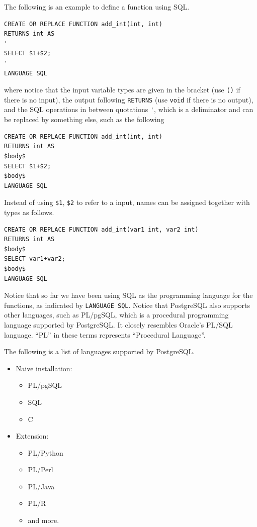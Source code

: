 The following is an example to define a function using SQL.
\begin{lstlisting}
CREATE OR REPLACE FUNCTION add_int(int, int)
RETURNS int AS
'
SELECT $1+$2;
'
LANGUAGE SQL
\end{lstlisting}
where notice that the input variable types are given in the bracket (use \verb|()| if there is no input), the output following \verb|RETURNS| (use \verb|void| if there is no output), and the SQL operations in between quotations \verb|'|, which is a deliminator and can be replaced by something else, such as the following
\begin{lstlisting}
CREATE OR REPLACE FUNCTION add_int(int, int)
RETURNS int AS
$body$
SELECT $1+$2;
$body$
LANGUAGE SQL
\end{lstlisting}

Instead of using \verb|$1|, \verb|$2| to refer to a input, names can be assigned together with types as follows.
\begin{lstlisting}
CREATE OR REPLACE FUNCTION add_int(var1 int, var2 int)
RETURNS int AS
$body$
SELECT var1+var2;
$body$
LANGUAGE SQL
\end{lstlisting}

Notice that so far we have been using SQL as the programming language for the functions, as indicated by \verb|LANGUAGE SQL|. Notice that PostgreSQL also supports other languages, such as PL/pgSQL, which is a procedural programming language supported by PostgreSQL. It closely resembles Oracle's PL/SQL language. ``PL'' in these terms represents ``Procedural Language''.

The following is a list of languages supported by PostgreSQL.
\begin{itemize}
	\item Naive installation:
	\begin{itemize}
		\item PL/pgSQL
		\item SQL
		\item C
	\end{itemize}
	\item Extension:
	\begin{itemize}
		\item PL/Python
		\item PL/Perl
		\item PL/Java
		\item PL/R
		\item and more.
	\end{itemize}
\end{itemize}

